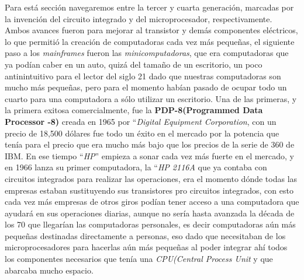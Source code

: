 \documentclass[letterpaper,12pt,oneside]{book}
\begin{document}
		Para está sección navegaremos entre la tercer y cuarta generación, marcadas por la invención del circuito integrado y del microprocesador, respectivamente.
		Ambos avances fueron para mejorar al transistor y demás componentes eléctricos, lo que permitió la creación de computadoras cada vez más pequeñas,
		el siguiente paso a los \textit{mainframes} fueron las \textit{minicomputadoras}, que era computadoras que ya podían caber en un auto, quizá del
		tamaño de un escritorio, un poco antinintuitivo para el lector del siglo 21 dado que nuestras computadoras son mucho más pequeñas, pero
		para el momento habían pasado de ocupar todo un cuarto para una computadora a sólo utilizar un escritorio. Una de las primeras, y la primera
		exitosa comercialmente, fue la \textbf{PDP-8(Programmed Data Processor -8)} creada en 1965 por ``\textit{Digital Equipment Corporation}, con un precio
		de 18,500 dólares fue todo un éxito en el mercado por la potencia que tenía para el precio que era mucho más bajo que los precios de la serie
		de 360 de IBM. En ese tiempo ``\textit{HP}'' empieza a sonar cada vez más fuerte en el mercado, y en 1966 lanza su primer computadora, la ``\textit{HP 2116A}
		que ya contaba con circuitos integrados para realizar las operaciones, era el momento dónde todas las empresas estaban sustituyendo sus
		transistores pro circuitos integrados, con esto cada vez más empresas de otros giros podían tener acceso a una computadora que 
		ayudará en sus operaciones diarias, aunque no sería hasta avanzada la década de los 70 que llegarían las computadoras personales, es decir
		computadoras aún más pequeñas destinadas directamente a personas, eso dado que necesitaban de los microprocesadores para hacerlas aún más pequeñas
		al poder integrar ahí todos los componentes necesarios que tenía una \textit{CPU(Central Process Unit} y que abarcaba mucho espacio.
		
\end{document}
